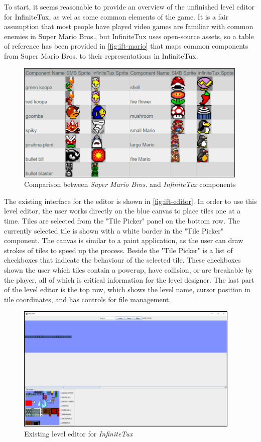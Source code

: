

To start, it seems reasonable to provide an overview of the unfinished level editor for
InfiniteTux, as wel as some common elements of the game. It is a fair assumption that most
people have played video games are familiar with common enemies in Super Mario Bros., but
InfiniteTux uses open-source assets, so a table of reference has been provided in \autoref{fig:ift-mario}
that maps common components from Super Mario Bros. to their representations in InfiniteTux.

\begin{figure}[h]
    \includegraphics[width=0.8\levelwidth]{img/fig10-ift-mario.png}
    \caption{Comparison between \emph{Super Mario Bros.} and \emph{InfiniteTux} components}
    \label{fig:ift-mario}
\end{figure}

The existing interface for the editor is shown in \autoref{fig:ift-editor}. In order to use
this level editor, the user works directly on the blue canvas to place tiles one at a time.
Tiles are selected from the "Tile Picker" panel on the bottom row. The currently selected
tile is shown with a white border in the "Tile Picker" component. The canvas is similar to
a paint application, as the user can draw strokes of tiles to speed up the process. Beside
the "Tile Picker" is a list of checkboxes that indicate the behaviour of the selected tile.
These checkboxes shown the user which tiles contain a powerup, have collision, or are
breakable by the player, all of which is critical information for the level designer. The
last part of the level editor is the top row, which shows the level name, cursor position
in tile coordinates, and has controls for file management.

\begin{figure}[h]
    \includegraphics[width=0.8\levelwidth]{img/fig11-ift-editor.png}
    \caption{Existing level editor for \emph{InfiniteTux}}
    \label{fig:more-chunks}
\end{figure}

